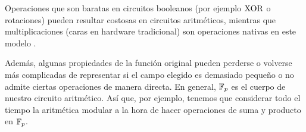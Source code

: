 Operaciones que son baratas en circuitos booleanos (por ejemplo $\mathrm{XOR}$ o rotaciones) pueden resultar costosas en circuitos aritméticos, mientras que multiplicaciones (caras en hardware tradicional) son operaciones nativas en este modelo \cite{vonzurGathen1991}.

Además, algunas propiedades de la función original pueden perderse o volverse más complicadas de representar si el campo elegido es demasiado pequeño o no admite ciertas operaciones de manera directa. En general, $\mathbb{F}_p$  es el cuerpo de nuestro circuito aritmético. Así que, por ejemplo, tenemos que considerar todo el tiempo la aritmética modular a la hora de hacer operaciones de suma y producto en $\mathbb{F}_p$.
